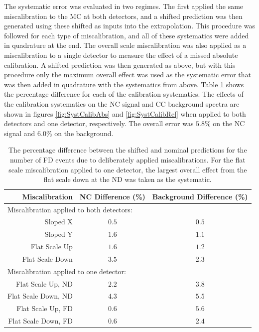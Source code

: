 The systematic error was evaluated in two regimes. The first applied the same miscalibration to the MC at both detectors, and a shifted prediction was then generated using these shifted as inputs into the extrapolation. This procedure was followed for each type of miscalibration, and all of these systematics were added in quadrature at the end. The overall scale miscalibration was also applied as a miscalibration to a single detector to measure the effect of a missed absolute calibration. A shifted prediction was then generated as above, but with this procedure only the maximum overall effect was used as the systematic error that was then added in quadrature with the systematics from above. Table \ref{tab:SystCalib} shows the percentage difference for each of the calibration systematics. The effects of the calibration systematics on the NC signal and CC background spectra are shown in figures \ref{fig:SystCalibAbs} and \ref{fig:SystCalibRel} when applied to both detectors and one detector, respectively. The overall error was $5.8\%$ on the NC signal and $6.0\%$ on the background.
\begin{table}[htb]
  \begin{center}
    \begin{tabular}{r c c}
      \hline\hline
      Miscalibration & NC Difference (\%) & Background Difference (\%) \\
      \hline
      \multicolumn{3}{l}{Miscalibration applied to both detectors:} \\
      Sloped X & $0.5$ & $0.5$ \\
      Sloped Y & $1.6$ & $1.1$ \\
      Flat Scale Up & $1.6$ & $1.2$ \\
      Flat Scale Down & $3.5$ & $2.3$ \\
      \multicolumn{3}{l}{Miscalibration applied to one detector:} \\
      Flat Scale Up, ND & $2.2$ & $3.8$ \\
      Flat Scale Down, ND & $4.3$ & $5.5$ \\
      Flat Scale Up, FD & $0.6$ & $5.6$ \\
      Flat Scale Down, FD & $0.6$ & $2.4$ \\
      \hline
    \end{tabular}
    \caption[Calibration Systematic Errors]{The percentage difference between the shifted and nominal predictions for the number of FD events due to deliberately applied miscalibrations. For the flat scale miscalibration applied to one detector, the largest overall effect from the flat scale down at the ND was taken as the systematic.}
    \label{tab:SystCalib}
  \end{center}
\end{table}

